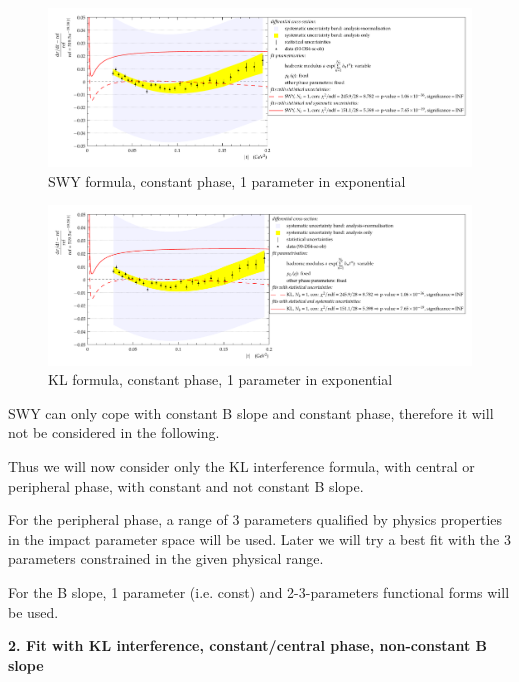 \begin{figure}
\begin{center}
\includegraphics[width=18cm]{simone/90/SWY,con,1,stat-stat+syst.pdf}
\vskip-3mm
\caption{SWY formula, constant phase, 1 parameter in exponential}
\label{fig:90,SWY,con,1}
\end{center}
\end{figure}

\begin{figure}
\begin{center}
\includegraphics[width=18cm]{simone/90/KL,con,1,stat-stat+syst.pdf}
\vskip-3mm
\caption{KL formula, constant phase, 1 parameter in exponential}
\label{fig:90,KL,con,1}
\end{center}
\end{figure}

SWY can only cope with constant B slope and constant phase, therefore it will not be
considered in the following.

Thus we will now consider only the KL interference formula, with central or peripheral
phase, with constant and not constant B slope.

For the peripheral phase, a range of 3 parameters qualified by physics properties in the impact
parameter space will be used. Later we will try a best fit with the 3 parameters constrained in
the given physical range.

For the B slope, 1 parameter (i.e. const) and 2-3-parameters functional forms will be used.

{\bf 2. Fit with KL interference, constant/central phase, non-constant B slope}

